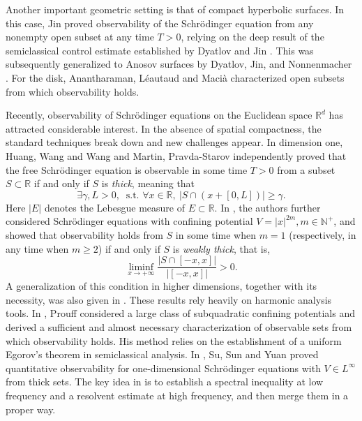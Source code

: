 \documentclass[11pt,oneside,reqno]{amsart}
\newcommand\R{\ensuremath{\mathbb{R}}}
\theoremstyle{definition}
\numberwithin{equation}{section}
\theoremstyle{plain}
\begin{document}
Another important geometric setting is that of compact hyperbolic surfaces. In this case, Jin \cite{jin2018control} proved observability of the Schrödinger equation from any nonempty open subset at any time $T>0$, relying on the deep result of the semiclassical control estimate established by Dyatlov and Jin \cite{dyatlov2018semiclassical}. This was subsequently generalized to Anosov surfaces by Dyatlov, Jin, and Nonnenmacher \cite{dyatlov2022control}. For the disk, Anantharaman, Léautaud and Macià \cite{anantharaman2016delocalization,anantharaman2016wigner} characterized open subsets from which observability holds. 

Recently, observability of Schrödinger equations on the Euclidean space $\R^d$ has attracted considerable interest. In the absence of spatial compactness, the standard techniques break down and new challenges appear. In dimension one, Huang, Wang and Wang \cite{huang2022obs} and Martin, Pravda-Starov \cite{martin2021geometric} independently proved that the free Schrödinger equation is observable in some time $T>0$ from a subset $S\subset \R$ if and only if $S$ is \emph{thick}, meaning that
\begin{equation*}
    \exists \gamma, L>0,\ \text{ s.t. } \forall x\in\R,\  |S\cap(x+[0,L])|\ge \gamma.
\end{equation*}
Here $|E|$ denotes the Lebesgue measure of $E\subset\R$. In \cite{huang2022obs}, the authors further considered Schrödinger equations with confining potential $V=|x|^{2m}, m\in \mathbb{N}^+$, and showed that observability holds from $S$ in some time when $m=1$ (respectively, in any time when $m\ge 2$) if and only if $S$ is \emph{weakly thick}, that is,
\begin{equation*}
    \liminf_{x\to +\infty} \frac{|S\cap [-x,x]|}{|[-x,x]|}>0.
\end{equation*}
A generalization of this condition in higher dimensions, together with its necessity, was also given in \cite{martin2021geometric}. These results rely heavily on harmonic analysis tools. In \cite{prouff2025obs}, Prouff considered a large class of subquadratic confining potentials and derived a sufficient and almost necessary characterization of observable sets from which observability holds. His method relies on the establishment of a uniform Egorov's theorem in semiclassical analysis. In \cite{su2025quantitative}, Su, Sun and Yuan proved quantitative observability for one-dimensional Schrödinger equations with $V\in L^\infty$ from thick sets. The key idea in \cite{su2025quantitative} is to establish a spectral inequality at low frequency and a resolvent estimate at high frequency, and then merge them in a proper way.
\end{document}
